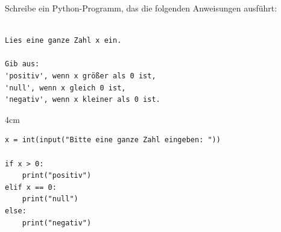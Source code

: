 \question[4]
Schreibe ein Python-Programm, das die folgenden Anweisungen ausführt:
\begin{lstlisting}

Lies eine ganze Zahl x ein.

Gib aus:
'positiv', wenn x größer als 0 ist,
'null', wenn x gleich 0 ist,
'negativ', wenn x kleiner als 0 ist.
\end{lstlisting}
\begin{solutionbox}{4cm}
\begin{lstlisting}
x = int(input("Bitte eine ganze Zahl eingeben: "))

if x > 0:
    print("positiv")
elif x == 0:
    print("null")
else:
    print("negativ")
\end{lstlisting}
\end{solutionbox}
